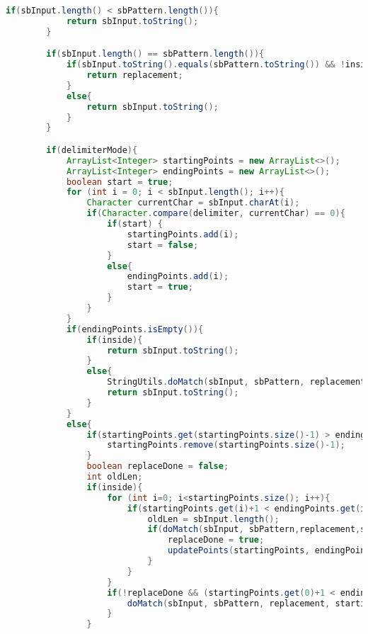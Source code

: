 \documentclass{article}
\begin{document}
\begin{lstlisting}[language=Java]
        if(sbInput.length() < sbPattern.length()){
            return sbInput.toString();
        }

        if(sbInput.length() == sbPattern.length()){
            if(sbInput.toString().equals(sbPattern.toString()) && !inside){
                return replacement;
            }
            else{
                return sbInput.toString();
            }
        }

        if(delimiterMode){
            ArrayList<Integer> startingPoints = new ArrayList<>();
            ArrayList<Integer> endingPoints = new ArrayList<>();
            boolean start = true;
            for (int i = 0; i < sbInput.length(); i++){
                Character currentChar = sbInput.charAt(i);
                if(Character.compare(delimiter, currentChar) == 0){
                    if(start) {
                        startingPoints.add(i);
                        start = false;
                    }
                    else{
                        endingPoints.add(i);
                        start = true;
                    }
                }
            }
            if(endingPoints.isEmpty()){
                if(inside){
                    return sbInput.toString();
                }
                else{
                    StringUtils.doMatch(sbInput, sbPattern, replacement, 0, sbInput.length());
                    return sbInput.toString();
                }
            }
            else{
                if(startingPoints.get(startingPoints.size()-1) > endingPoints.get(endingPoints.size()-1)){
                    startingPoints.remove(startingPoints.size()-1);
                }
                boolean replaceDone = false;
                int oldLen;
                if(inside){
                    for (int i=0; i<startingPoints.size(); i++){
                        if(startingPoints.get(i)+1 < endingPoints.get(i)){
                            oldLen = sbInput.length();
                            if(doMatch(sbInput, sbPattern,replacement,startingPoints.get(i)+1, endingPoints.get(i))){
                                replaceDone = true;
                                updatePoints(startingPoints, endingPoints, startingPoints.get(i), sbInput.length() - oldLen);
                            }
                        }
                    }
                    if(!replaceDone && (startingPoints.get(0)+1 < endingPoints.get(endingPoints.size()-1))){
                        doMatch(sbInput, sbPattern, replacement, startingPoints.get(0)+1, endingPoints.get(endingPoints.size()-1));
                    }
                }

\end{lstlisting}
\end{document}
